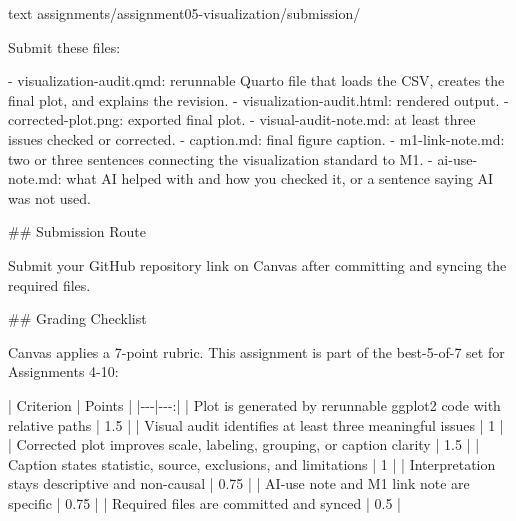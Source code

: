 \documentclass[
  letterpaper,
  DIV=11,
  numbers=noendperiod,
  oneside]{scrreprt}
\newenvironment{Shaded}{\begin{snugshade}}{\end{snugshade}}
\newcommand{\FunctionTok}[1]{\textcolor[rgb]{0.28,0.35,0.67}{#1}}
\newcommand{\InformationTok}[1]{\textcolor[rgb]{0.37,0.37,0.37}{#1}}
\newcommand{\NormalTok}[1]{\textcolor[rgb]{0.00,0.23,0.31}{#1}}
\newcommand{\PreprocessorTok}[1]{\textcolor[rgb]{0.68,0.00,0.00}{#1}}
\newcommand{\SpecialStringTok}[1]{\textcolor[rgb]{0.13,0.47,0.30}{#1}}
\begin{document}
\begin{Shaded}
\begin{Highlighting}[numbers=left,,]
\InformationTok{\textasciigrave{}\textasciigrave{}\textasciigrave{}text}
\InformationTok{assignments/assignment05{-}visualization/submission/}
\InformationTok{\textasciigrave{}\textasciigrave{}\textasciigrave{}}

\NormalTok{Submit these files:}

\SpecialStringTok{{-} }\InformationTok{\textasciigrave{}visualization{-}audit.qmd\textasciigrave{}}\NormalTok{: rerunnable Quarto file that loads the CSV, creates the final plot, and explains the revision.}
\SpecialStringTok{{-} }\InformationTok{\textasciigrave{}visualization{-}audit.html\textasciigrave{}}\NormalTok{: rendered output.}
\SpecialStringTok{{-} }\InformationTok{\textasciigrave{}corrected{-}plot.png\textasciigrave{}}\NormalTok{: exported final plot.}
\SpecialStringTok{{-} }\InformationTok{\textasciigrave{}visual{-}audit{-}note.md\textasciigrave{}}\NormalTok{: at least three issues checked or corrected.}
\SpecialStringTok{{-} }\InformationTok{\textasciigrave{}caption.md\textasciigrave{}}\NormalTok{: final figure caption.}
\SpecialStringTok{{-} }\InformationTok{\textasciigrave{}m1{-}link{-}note.md\textasciigrave{}}\NormalTok{: two or three sentences connecting the visualization standard to M1.}
\SpecialStringTok{{-} }\InformationTok{\textasciigrave{}ai{-}use{-}note.md\textasciigrave{}}\NormalTok{: what AI helped with and how you checked it, or a sentence saying AI was not used.}

\FunctionTok{\#\# Submission Route}

\NormalTok{Submit your GitHub repository link on Canvas after committing and syncing the required files.}

\FunctionTok{\#\# Grading Checklist}

\NormalTok{Canvas applies a 7{-}point rubric. This assignment is part of the best{-}5{-}of{-}7 set for Assignments 4{-}10:}

\PreprocessorTok{|}\NormalTok{ Criterion }\PreprocessorTok{|}\NormalTok{ Points }\PreprocessorTok{|}
\PreprocessorTok{|{-}{-}{-}|{-}{-}{-}:|}
\PreprocessorTok{|}\NormalTok{ Plot is generated by rerunnable }\InformationTok{\textasciigrave{}ggplot2\textasciigrave{}}\NormalTok{ code with relative paths }\PreprocessorTok{|}\NormalTok{ 1.5 }\PreprocessorTok{|}
\PreprocessorTok{|}\NormalTok{ Visual audit identifies at least three meaningful issues }\PreprocessorTok{|}\NormalTok{ 1 }\PreprocessorTok{|}
\PreprocessorTok{|}\NormalTok{ Corrected plot improves scale, labeling, grouping, or caption clarity }\PreprocessorTok{|}\NormalTok{ 1.5 }\PreprocessorTok{|}
\PreprocessorTok{|}\NormalTok{ Caption states statistic, source, exclusions, and limitations }\PreprocessorTok{|}\NormalTok{ 1 }\PreprocessorTok{|}
\PreprocessorTok{|}\NormalTok{ Interpretation stays descriptive and non{-}causal }\PreprocessorTok{|}\NormalTok{ 0.75 }\PreprocessorTok{|}
\PreprocessorTok{|}\NormalTok{ AI{-}use note and M1 link note are specific }\PreprocessorTok{|}\NormalTok{ 0.75 }\PreprocessorTok{|}
\PreprocessorTok{|}\NormalTok{ Required files are committed and synced }\PreprocessorTok{|}\NormalTok{ 0.5 }\PreprocessorTok{|}


\end{Highlighting}
\end{Shaded}
\end{document}
